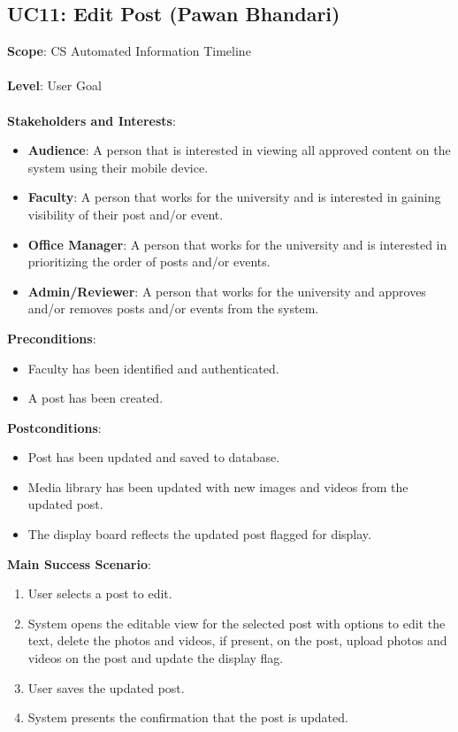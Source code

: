 \documentclass{article}
\begin{document}
\subsection{\textbf{UC11}: Edit Post (Pawan Bhandari)}
 \textbf{Scope}: CS Automated Information Timeline\\
 \\
     \textbf{Level}: User Goal\\
    \\
    \textbf{Stakeholders and Interests}:
    \begin{itemize}[label={}]
         \item \textbf{Audience}: A person that is interested in viewing all approved content on the system using their mobile device.
         \item \textbf{Faculty}: A person that works for the university and is interested in gaining visibility of their post and/or event.
         \item \textbf{Office Manager}: A person that works for the university and is interested in prioritizing the order of posts and/or events. 
          \item \textbf{Admin/Reviewer}: A person that works for the university and approves and/or removes posts and/or events from the system. 
    \end{itemize}
    \textbf{Preconditions}:
    \begin{itemize}[label={}]
        \item Faculty has been identified and authenticated.
        \item A post has been created. 
    \end{itemize}
    \textbf{Postconditions}:
        \begin{itemize}[label={}]
        \item Post has been updated and saved to database.
        \item Media library has been updated with new images and videos from the updated post.
        \item The display board reflects the updated post flagged for display.
    \end{itemize}
    \textbf{Main Success Scenario}:
    \begin{enumerate}
        \item User selects a post to edit.
        \item System opens the editable view for the selected post with options to edit the text, delete the photos and videos, if present, on the post, upload photos and videos on the post and update the display flag.
        \item User saves the updated post.
        \item System presents the confirmation that the post is updated.
    \end{enumerate}
\end{document}
